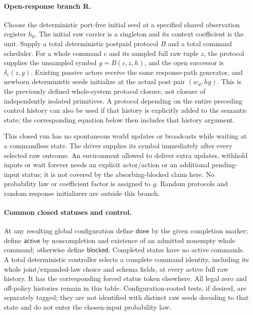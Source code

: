 \documentclass[11pt]{article}
\begin{document}
\paragraph{Open-response branch R.}
Choose the deterministic port-free initial seed at a specified shared observation register $h_0$. The initial raw carrier is a singleton and its context coefficient is the unit. Supply a total deterministic postpaid protocol $B$ and a total command scheduler. For a whole command $c$ and its sampled full raw tuple $z$, the protocol supplies the unsampled symbol $g=B(c,z,h)$, and the open successor is $\delta_c(z,g)$. Existing passive actors receive the same response-path generator, and newborn deterministic seeds initialize at the actual post pair $(w_d,hg)$. This is the previously defined whole-system protocol closure, not closure of independently isolated primitives. A protocol depending on the entire preceding control history can also be used if that history is explicitly added to the semantic state; the corresponding equation below then includes that history argument.

This closed run has no spontaneous world updates or broadcasts while waiting at a commandless state. The driver supplies its symbol immediately after every selected raw outcome. An environment allowed to deliver extra updates, withhold inputs or wait forever needs an explicit actor/action or an additional pending-input status; it is not covered by the absorbing-blocked claim here. No probability law or coefficient factor is assigned to $g$. Random protocols and random response initializers are outside this branch.

\paragraph{Common closed statuses and control.}
At any resulting global configuration define $\mathsf{done}$ by the given completion marker; define $\mathsf{active}$ by noncompletion and existence of an admitted nonempty whole command; otherwise define $\mathsf{blocked}$. Completed states have no active commands. A total deterministic controller selects a complete command identity, including its whole joint/expanded-law choice and schema fields, at every active full raw history. It has the corresponding forced status token elsewhere. All legal zero and off-policy histories remain in this table. Configuration-rooted tests, if desired, are separately tagged; they are not identified with distinct raw seeds decoding to that state and do not enter the chosen-input probability law.
\end{document}
